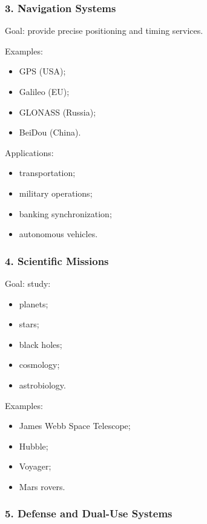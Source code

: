 \documentclass[10pt,a4paper,twocolumn]{article}
\begin{document}
\subsubsection*{3. Navigation Systems}

Goal:
provide precise positioning and timing services.

Examples:
\begin{itemize}
    \item GPS (USA);
    \item Galileo (EU);
    \item GLONASS (Russia);
    \item BeiDou (China).
\end{itemize}

Applications:
\begin{itemize}
    \item transportation;
    \item military operations;
    \item banking synchronization;
    \item autonomous vehicles.
\end{itemize}


\subsubsection*{4. Scientific Missions}

Goal:
study:
\begin{itemize}
    \item planets;
    \item stars;
    \item black holes;
    \item cosmology;
    \item astrobiology.
\end{itemize}

Examples:
\begin{itemize}
    \item James Webb Space Telescope;
    \item Hubble;
    \item Voyager;
    \item Mars rovers.
\end{itemize}


\subsubsection*{5. Defense and Dual-Use Systems}
\end{document}
